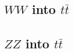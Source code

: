 \documentclass[a4paper,11pt]{article}
\begin{document}
\clearpage
\subsection{$WW$ into $t \bar t$}





\clearpage
\subsection{$ZZ$ into $t \bar t$}

\end{document}
